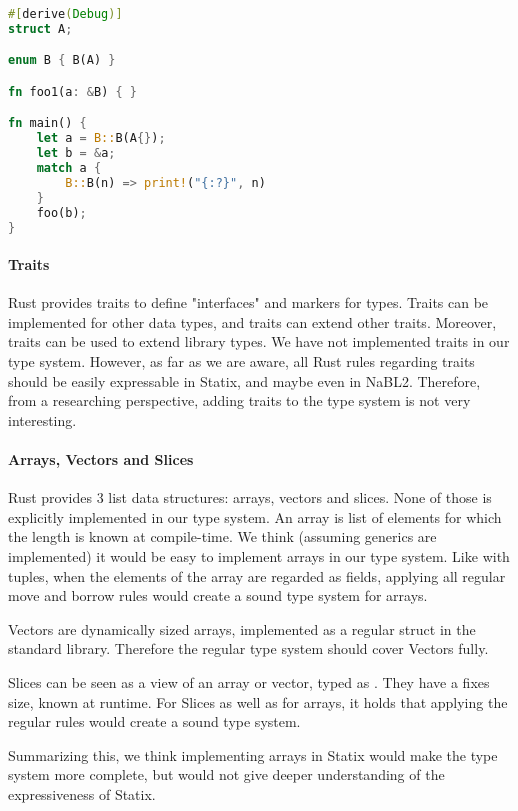 \begin{lstlisting}[language=rust, showstringspaces=false, escapechar=~, label={lst:match_ref}, caption={Example of ref keyword}]
#[derive(Debug)]
struct A;

enum B { B(A) } 

fn foo1(a: &B) { }

fn main() {
    let a = B::B(A{});
    let b = &a;
    match a {
        B::B(n) => print!("{:?}", n)
    }
    foo(b);
}
\end{lstlisting}

\paragraph{Traits}

Rust provides traits to define "interfaces" and markers for types. Traits can be implemented for other data types, and traits can extend other traits. Moreover, traits can be used to extend library types. We have not implemented traits in our type system. However, as far as we are aware, all Rust rules regarding traits should be easily expressable in Statix, and maybe even in NaBL2. Therefore, from a researching perspective, adding traits to the type system is not very interesting.

\paragraph{Arrays, Vectors and Slices}

Rust provides 3 list data structures: arrays, vectors and slices. None of those is explicitly implemented in our type system. An array is list of elements for which the length is known at compile-time. We think (assuming generics are implemented) it would be easy to implement arrays in our type system. Like with tuples, when the elements of the array are regarded as fields, applying all regular move and borrow rules would create a sound type system for arrays.

Vectors are dynamically sized arrays, implemented as a regular struct in the standard library. Therefore the regular type system should cover Vectors fully.

Slices can be seen as a view of an array or vector, typed as \code{&[T]}. They have a fixes size, known at runtime. For Slices as well as for arrays, it holds that applying the regular rules would create a sound type system. 

Summarizing this, we think implementing arrays in Statix would make the type system more complete, but would not give deeper understanding of the expressiveness of Statix.

